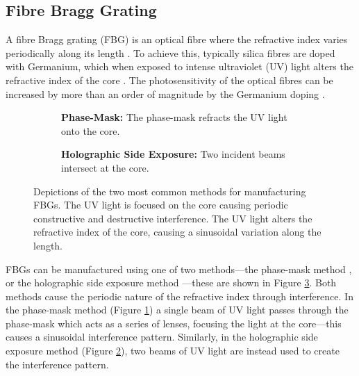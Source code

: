 \subsection{Fibre Bragg Grating}
A fibre Bragg grating (FBG) is an optical fibre where the refractive index varies periodically along its length \cite{ferreira}. To achieve this, typically silica fibres are doped with Germanium, which when exposed to intense ultraviolet (UV) light alters the refractive index of the core \cite{becker, starodoumov}. The photosensitivity of the optical fibres can be increased by more than an order of magnitude by the Germanium doping \cite{becker, ferreira}. \\

\begin{figure}[p]
\centering
\begin{subfigure}{\textwidth}
\centering

\caption{\textbf{Phase-Mask:} The phase-mask refracts the UV light onto the core.}
\label{fig:phasemask}
\vspace{10mm}
\end{subfigure}
\begin{subfigure}{\textwidth}
\centering

\caption{\textbf{Holographic Side Exposure:} Two incident beams intersect at the core.}
\label{fig:holographic}
\end{subfigure}
\caption[Manufacture methods of fibre Bragg gratings.]{Depictions of the two most common methods for manufacturing FBGs. The UV light is focused on the core causing periodic constructive and destructive interference. The UV light alters the refractive index of the core, causing a sinusoidal variation along the length.}
\label{fig:fbgmake}
\end{figure}

FBGs can be manufactured using one of two methods---the phase-mask method \cite{agrawal2002, alazzawi, becker, starodoumov}, or the holographic side exposure method \cite{agrawal2002, alazzawi, becker, ferreira, starodoumov}---these are shown in Figure \ref{fig:fbgmake}. Both methods cause the periodic nature of the refractive index through interference. In the phase-mask method (Figure \ref{fig:phasemask}) a single beam of UV light passes through the phase-mask which acts as a series of lenses, focusing the light at the core---this causes a sinusoidal interference pattern. Similarly, in the holographic side exposure method (Figure \ref{fig:holographic}), two beams of UV light are instead used to create the interference pattern. \\

